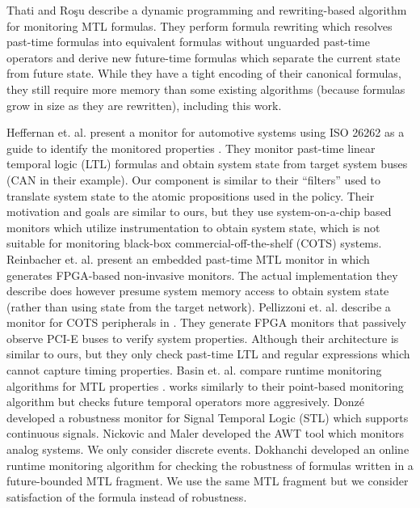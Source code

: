 %
Thati and Ro\c{s}u \cite{Thati2005} describe a dynamic programming and rewriting-based
algorithm for monitoring MTL formulas.
They perform formula rewriting which resolves past-time formulas
into equivalent formulas without unguarded past-time operators and derive new future-time
formulas which separate the current state from future state.
While they have a tight encoding of their canonical formulas, they still require more memory
than some existing algorithms (because formulas
grow in size as they are rewritten), including this work.


Heffernan et. al. present a monitor for automotive systems using ISO 26262 as a guide
to identify the monitored properties  \cite{Heffernan2014}.
They monitor past-time linear temporal logic (LTL) formulas and obtain system state from target system buses (CAN in their example).
Our \sfmap component is similar to their ``filters'' used to translate system state to the atomic propositions used in the policy.
Their motivation and goals are similar to ours, but they use system-on-a-chip based
monitors which utilize instrumentation to obtain system state, which is not suitable for monitoring black-box commercial-off-the-shelf (COTS)
systems. Reinbacher et. al. present an embedded past-time MTL monitor in \cite{Reinbacher2013} which generates FPGA-based non-invasive monitors.
The actual implementation they describe does however presume system memory access to obtain system state (rather than using state from the target network).
Pellizzoni et. al. describe a monitor for COTS peripherals in \cite{Pellizzoni2008}.
They generate FPGA monitors that passively observe PCI-E buses to verify system properties.
Although their architecture is similar to ours, but they only check past-time LTL and
regular expressions which cannot capture timing properties.
Basin et. al. compare runtime monitoring algorithms for MTL properties \cite{Basin2012}.
\monitor works similarly to their point-based monitoring algorithm but \monitor checks
future temporal operators more aggresively.
Donz\'e \etal \cite{DFM13} developed a robustness monitor for Signal Temporal Logic (STL) which
supports continuous signals.
Nickovic and Maler \cite{NM07} developed the  AWT tool which monitors analog systems.
We only consider discrete events. Dokhanchi \etal \cite{DHF14}
developed an online runtime monitoring algorithm for checking the robustness of formulas written in a
future-bounded MTL fragment. We use the same MTL fragment but we consider satisfaction of the formula
instead of robustness.

